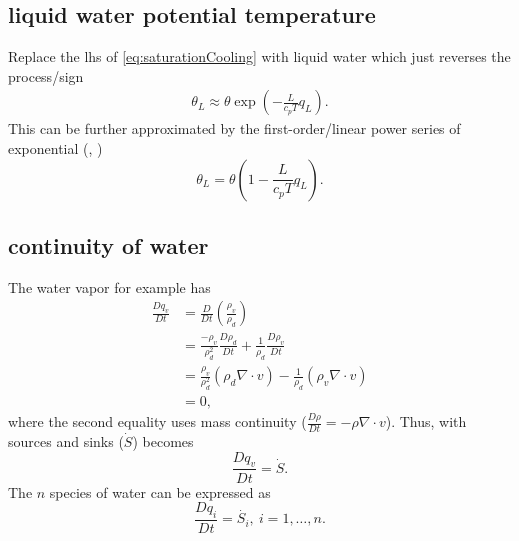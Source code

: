 \subsection{liquid water potential temperature}
\begin{derv*} 
Replace the lhs of \eqref{eq:saturationCooling} with liquid water which just
reverses the process/sign 
\begin{equation}
\begin{aligned}
   \boxed{\theta_L \approx \theta\exp(-\frac{L}{c_pT} q_{L})}.
\end{aligned}
\end{equation}
This can be further approximated by the first-order/linear power series of
exponential (\cite{betts1973non}, \cite{grenier2001moist})
\begin{equation}
   \boxed{\theta_L = \theta(1 - \frac{L}{c_pT} q_{L})}.
\end{equation}
\end{derv*}


\subsection{continuity of water}
\begin{derv*} 
The water vapor for example has
\begin{equation}
\begin{aligned}
   \frac{D q_v}{D t} & = \frac{D}{D t} (\frac{\rho_v}{\rho_d}) \\
        & = \frac{-\rho_v}{\rho_d^2} \frac{D \rho_d}{D t} + \frac{1}{\rho_d}\frac{D \rho_v}{D t} \\
        & = \frac{\rho_v}{\rho_d^2}(\rho_d \nabla \cdot v) - \frac{1}{\rho_d}(\rho_v \nabla \cdot v) \\
        & = 0,
\end{aligned}
\end{equation}
where the second equality uses mass continuity ($\frac{D \rho}{D t} = -\rho \nabla\cdot v$). Thus,
with sources and sinks ($\dot{S}$) becomes
\begin{equation}
   \frac{D q_v}{D t} = \dot{S}.
\end{equation}
The $n$ species of water can be expressed as
\begin{equation}\label{eq:cont_w}
   \boxed{\frac{D q_i}{D t} = \dot{S_i}, \ i=1,\dotsc,n}.
\end{equation}
\end{derv*}



